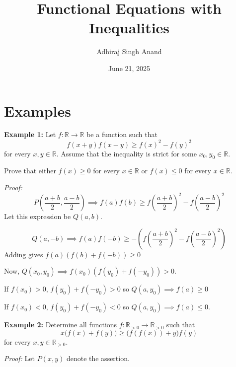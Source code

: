 \documentclass[10pt,letterpaper]{article}
\title{Functional Equations with Inequalities}
\author{Adhiraj Singh Anand}
\date{June 21, 2025}
\begin{document}
\maketitle
\section{Examples}

\par\vspace{12pt}
\begin{tcolorbox}[breakable,title={IMO Shortlist 2023 A2},colbacktitle=black!4,coltitle=black,fonttitle=\normalfont]
\textbf{Example 1:} Let $f:\mathbb{R}\to\mathbb{R}$ be a function such that
\[f(x+y)f(x-y)\geqslant f(x)^2-f(y)^2\]
for every $x,y\in\mathbb{R}$. Assume that the inequality is strict for some $x_0,y_0\in\mathbb{R}$.

Prove that either $f(x)\geqslant0$ for every $x\in\mathbb{R}$ or $f(x)\leqslant0$ for every $x\in\mathbb{R}$.
\end{tcolorbox}
\textit{Proof:}
\[P\left(\frac{a+b}{2},\frac{a-b}{2}\right)\implies f(a)f(b)\ge f\left(\frac{a+b}{2}\right)^2-f\left(\frac{a-b}{2}\right)^2\]Let this expression be $Q(a,b)$.

\[Q(a,-b)\implies f(a)f(-b)\ge -\left(f\left(\frac{a+b}{2}\right)^2-f\left(\frac{a-b}{2}\right)^2\right)\]Adding gives $f(a)(f(b)+f(-b))\ge 0$

Now, $Q(x_0,y_0)\implies f(x_0)(f(y_0)+f(-y_0))>0$.

If $f(x_0)>0$, $f(y_0)+f(-y_0)>0$ so $Q(a,y_0)\implies f(a)\ge 0$

If $f(x_0)<0$, $f(y_0)+f(-y_0)<0$ so $Q(a,y_0)\implies f(a)\le 0$.
\par{}

\par\vspace{12pt}
\begin{tcolorbox}[breakable,title={IMO Shortlist 2023 A4},colbacktitle=black!4,coltitle=black,fonttitle=\normalfont]
\textbf{Example 2:} Determine all functions $f:\mathbb{R}_{>0}\to\mathbb{R}_{>0}$ such that
\[x\big(f(x)+f(y)\big)\geqslant\big(f(f(x))+y\big)f(y)\]
for every $x,y\in\mathbb{R}_{>0}$.
\end{tcolorbox}
\textit{Proof:}
Let $P(x,y)$ denote the assertion.
\end{document}
